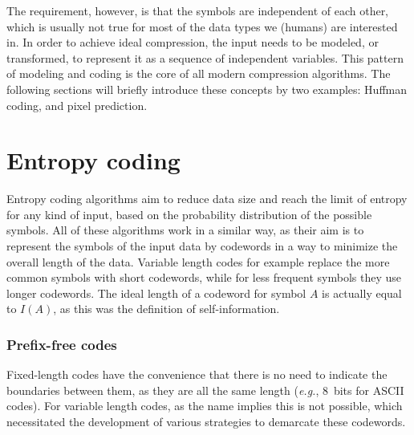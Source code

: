       The requirement, however, is that the symbols are independent of each other, which is usually not true for most of the data types we (humans) are interested in. In order to achieve ideal compression, the input needs to be modeled, or transformed, to represent it as a sequence of independent variables. This pattern of modeling and coding \cite{rissanen_universal_1981} is the core of all modern compression algorithms. 
      The following sections will briefly introduce these concepts by two examples: Huffman coding, and pixel prediction.
      
      
    \section{Entropy coding}
      \label{sec:entropyCoding}

      Entropy coding algorithms aim to reduce data size and reach the limit of entropy for any kind of input, based on the probability distribution of the possible symbols. All of these algorithms work in a similar way, as their aim is to represent the symbols of the input data by codewords in a way to minimize the overall length of the data. Variable length codes for example replace the more common symbols with short codewords, while for less frequent symbols they use longer codewords. The ideal length of a codeword for symbol $A$ is actually equal to $I(A)$, as this was the definition of self-information.


      \subsubsection{Prefix-free codes}

      Fixed-length codes have the convenience that there is no need to indicate the boundaries between them, as they are all the same length (\textit{e.g.}, \SI{8}{bits} for ASCII codes). For variable length codes, as the name implies this is not possible, which necessitated the development of various strategies to demarcate these codewords. 

